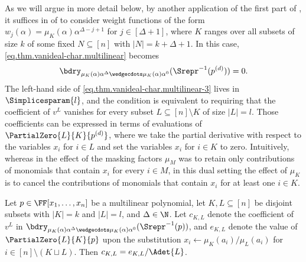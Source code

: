 As we will argue in more detail below, by another application of the first part of , it suffices in  of  to consider weight functions of the form $w_j(\alpha)=\mu_K(\alpha) \alpha^{\Delta-j+1}$ for $j \in [\Delta+1]$, where $K$ ranges over all subsets of size $k$ of some fixed $N \subseteq [n]$ with $|N|=k+\Delta+1$. In this case, \eqref{eq.thm.vanideal-char.multilinear} becomes
\begin{equation}\label{eq.thm.vanideal-char.multilinear-3}
\bdry_{\mu_K(\alpha)\alpha^{\Delta} \wedgecdots \mu_K(\alpha)\alpha^0}(  \Srepr^{-1}(p^{(d)}) ) = 0.
\end{equation}
The left-hand side of \eqref{eq.thm.vanideal-char.multilinear-3} lives in $\Simplicesparam{l}$, and the condition is equivalent to requiring that the coefficient of $v^L$ vanishes for every subset $L \subseteq [n]\setminus K$ of size $|L|=l$. Those coefficients can be expressed in terms of evaluations of $\PartialZero{L}{K}{p^{(d)}}$, where we take the partial derivative with respect to the variables $x_i$ for $i \in L$ and set the variables $x_i$ for $i \in K$ to zero. Intuitively, whereas in  the effect of the masking factors $\mu_M$ was to retain only contributions of monomials that contain $x_i$ for every $i \in M$, in this dual setting the effect of $\mu_K$ is to cancel the contributions of monomials that contain $x_i$ for at least one $i \in K$. 

\begin{proposition}
    \label{prop.ideal.membership.altalg}
    Let $p \in \FF[x_1,\dots,x_n]$ be a multilinear polynomial, let $K,L \subseteq [n]$ be disjoint subsets with $|K|=k$ and $|L|=l$, and $\Delta \in \N$. Let $c_{K,L}$ denote the coefficient of $v^L$ in $\bdry_{\mu_K(\alpha)\alpha^{\Delta} \wedgecdots \mu_K(\alpha)\alpha^0}(\Srepr^{-1}(p))$, and $e_{K,L}$ denote the value of $\PartialZero{L}{K}{p}$
    upon the substitution $x_i\gets \mu_K(a_i)/\mu_L(a_i)$ for $i \in [n]\setminus (K \sqcup L)$. Then $c_{K,L} = e_{K,L} / \Adet{L}$. 
\end{proposition}


